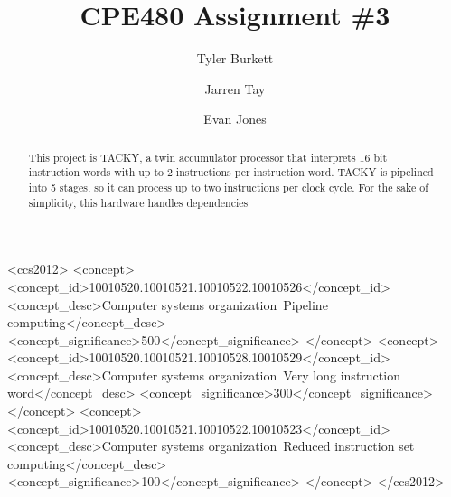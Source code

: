 \documentclass[sigconf]{acmart}
\begin{document}
%
\title{CPE480 Assignment \#3 }

%
\author{Tyler Burkett}

\author{Jarren Tay}

\author{Evan Jones}
%
\renewcommand{\shortauthors}{Burkett, Jones, Tay}

%
\begin{abstract}
This project is TACKY, a twin accumulator processor that interprets 16 bit instruction words with up to 2 instructions per instruction word. TACKY is pipelined into 5 stages, so it can process up to two instructions per clock cycle. For the sake of simplicity, this hardware handles dependencies
\end{abstract}

%
%
  \begin{CCSXML}
<ccs2012>
<concept>
<concept_id>10010520.10010521.10010522.10010526</concept_id>
<concept_desc>Computer systems organization~Pipeline computing</concept_desc>
<concept_significance>500</concept_significance>
</concept>
<concept>
<concept_id>10010520.10010521.10010528.10010529</concept_id>
<concept_desc>Computer systems organization~Very long instruction word</concept_desc>
<concept_significance>300</concept_significance>
</concept>
<concept>
<concept_id>10010520.10010521.10010522.10010523</concept_id>
<concept_desc>Computer systems organization~Reduced instruction set computing</concept_desc>
<concept_significance>100</concept_significance>
</concept>
</ccs2012>
\end{CCSXML}
\end{document}
